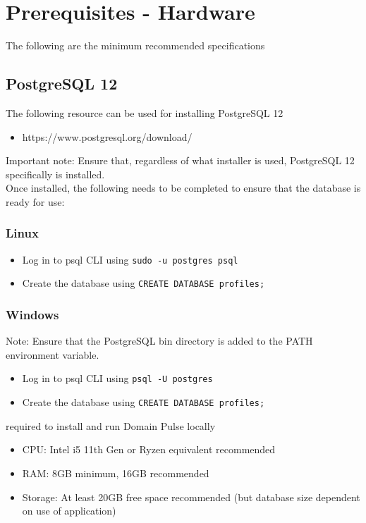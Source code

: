 \documentclass{article}
\newcommand{\code}[1]{\colorbox{light-gray}{\texttt{#1}}}
\begin{document}
\section{Prerequisites - Hardware}
The following are the minimum recommended specifications\subsection{PostgreSQL 12}
The following resource can be used for installing PostgreSQL 12
\begin{itemize}
    \item https://www.postgresql.org/download/
\end{itemize}
Important note: Ensure that, regardless of what installer is used, PostgreSQL 12 specifically is installed.\\
Once installed, the following needs to be completed to ensure that the database is ready for use:
\subsubsection*{Linux}
\begin{itemize}
    \item Log in to psql CLI using \code{sudo -u postgres psql}
    \item Create the database using \code{CREATE DATABASE profiles;}
\end{itemize}

\subsubsection*{Windows}
Note: Ensure that the PostgreSQL bin directory is added to the PATH environment variable.\\
\begin{itemize}
    \item Log in to psql CLI using \code{psql -U postgres}
    \item Create the database using \code{CREATE DATABASE profiles;}
\end{itemize} required to install and run Domain Pulse locally
\begin{itemize}
    \item CPU: Intel i5 11th Gen or Ryzen equivalent recommended
    \item RAM: 8GB minimum, 16GB recommended
    \item Storage: At least 20GB free space recommended (but database size dependent on use of application)
\end{itemize}
\end{document}
